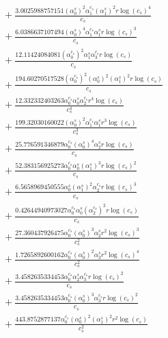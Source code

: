 \documentclass[10pt]{article}
\begin{document}
\begin{align*}
&{}  + \frac{3.0025988757151 \left(\alpha_{0}^s\right)^{2} \alpha_{1}^{c_s} \left(\alpha_{1}^s\right)^{2} r \log{\left(c_{s} \right)}^{4}}{c_{s}} \\
&{}  + \frac{6.0386637107494 \left(\alpha_{0}^s\right)^{4} \alpha_{1}^{c_s} \alpha_{1}^s r \log{\left(c_{s} \right)}^{3}}{c_{s}} \\
&{}  + \frac{12.11424084081 \left(\alpha_{0}^{c_s}\right)^{2} \alpha_{1}^s \alpha_{3}^{c_s} r \log{\left(c_{s} \right)}}{c_{s}} \\
&{}  + \frac{194.60270517528 \left(\alpha_{0}^{c_s}\right)^{2} \left(\alpha_{0}^s\right)^{2} \left(\alpha_{1}^s\right)^{2} r \log{\left(c_{s} \right)}}{c_{s}} \\
&{}  + \frac{12.332332403263 \alpha_{0}^{c_s} \alpha_{0}^s \alpha_{2}^{c_s} r^{4} \log{\left(c_{s} \right)}}{c_{s}^{4}} \\
&{}  + \frac{199.32030160022 \left(\alpha_{0}^s\right)^{2} \alpha_{1}^{c_s} \alpha_{1}^s r^{3} \log{\left(c_{s} \right)}}{c_{s}^{3}} \\
&{}  + \frac{25.776591346879 \alpha_{0}^{c_s} \left(\alpha_{0}^s\right)^{4} \alpha_{2}^s r \log{\left(c_{s} \right)}}{c_{s}} \\
&{}  + \frac{52.383156925273 \alpha_{0}^{c_s} \alpha_{0}^s \left(\alpha_{1}^s\right)^{3} r \log{\left(c_{s} \right)}^{2}}{c_{s}} \\
&{}  + \frac{6.5658969450555 \alpha_{0}^s \left(\alpha_{1}^s\right)^{2} \alpha_{2}^{c_s} r \log{\left(c_{s} \right)}^{3}}{c_{s}} \\
&{}  + \frac{0.42644940973027 \alpha_{0}^{c_s} \alpha_{0}^s \left(\alpha_{2}^{c_s}\right)^{2} r \log{\left(c_{s} \right)}}{c_{s}} \\
&{}  + \frac{27.360437926475 \alpha_{0}^{c_s} \left(\alpha_{0}^s\right)^{3} \alpha_{2}^s r^{2} \log{\left(c_{s} \right)}^{3}}{c_{s}^{2}} \\
&{}  + \frac{1.7265892600162 \alpha_{0}^{c_s} \left(\alpha_{0}^s\right)^{2} \alpha_{3}^s r^{2} \log{\left(c_{s} \right)}^{4}}{c_{s}^{2}} \\
&{}  + \frac{3.4582635334453 \alpha_{0}^{c_s} \alpha_{2}^s \alpha_{3}^{c_s} r \log{\left(c_{s} \right)}^{2}}{c_{s}} \\
&{}  + \frac{3.4582635334453 \alpha_{0}^{c_s} \left(\alpha_{0}^s\right)^{3} \alpha_{3}^{c_s} r \log{\left(c_{s} \right)}^{2}}{c_{s}} \\
&{}  + \frac{443.8752877137 \alpha_{0}^{c_s} \left(\alpha_{0}^s\right)^{2} \left(\alpha_{1}^s\right)^{2} r^{2} \log{\left(c_{s} \right)}}{c_{s}^{2}} \\

\end{align*}
\end{document}
